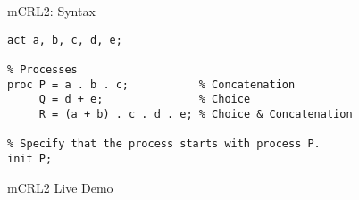 \documentclass[aspectratio=1610]{beamer}
\begin{document}
  \begin{frame}[fragile]{mCRL2: Syntax}
    \begin{lstlisting}[language=mCRL2]
% Actions
act a, b, c, d, e;

% Processes
proc P = a . b . c;           % Concatenation
     Q = d + e;               % Choice
     R = (a + b) . c . d . e; % Choice & Concatenation

% Specify that the process starts with process P.
init P;
    \end{lstlisting}
  \end{frame}

  \begin{frame}[standout]
    mCRL2 Live Demo
  \end{frame}
\end{document}
